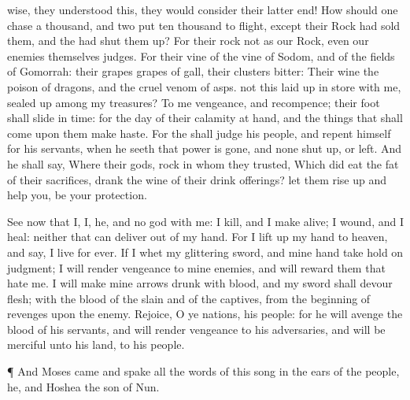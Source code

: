 {wise,
{} they
understood this,
{} they would
consider their latter
end!
How should
one
chase a
thousand, and
two put
ten
thousand to
flight,
except their
Rock had
sold
them, and the
{} had shut them
up?
For their
rock
{} not as our
Rock, even our
enemies themselves
{}
judges.
For their
vine
{} of the
vine of
Sodom, and of the
fields of
Gomorrah: their
grapes
{}
grapes of
gall, their
clusters
{}
bitter:
Their
wine
{} the
poison of
dragons, and the
cruel
venom of
asps.
 not this laid up in
store with me,
{} sealed
up among my
treasures?
To me
{}
vengeance, and
recompence; their
foot shall
slide in
{}
time: for the
day of their
calamity
{} at
hand, and the things that shall
come upon them make
haste.
For the
{} shall
judge his
people, and
repent himself for his
servants, when he
seeth that
{}
power is
gone, and
{}
none shut
up, or
left.
And he shall
say, Where
{} their
gods,
{}
rock in whom they
trusted,
Which did
eat the
fat of their
sacrifices,
{}
drank the
wine of their drink
offerings? let them rise
up and
help you,
{} be your
protection.
\par }{\PP {}See now that I,
{} I,
{} he, and
{} no
god with me: I
kill, and I make
alive; I
wound, and I
heal: neither
{} that can
deliver out of my
hand.
For I lift
up my
hand to
heaven, and
say, I
live for
ever.
If I
whet my
glittering
sword, and mine
hand take
hold on
judgment; I will
render
vengeance to mine
enemies, and will
reward them that
hate me.
I will make mine
arrows
drunk with
blood, and my
sword shall
devour
flesh;
{} with the
blood of the
slain and of the
captives, from the
beginning of
revenges upon the
enemy.
Rejoice, O ye
nations,
{} his
people: for he will
avenge the
blood of his
servants, and will
render
vengeance to his
adversaries, and will be
merciful unto his
land,
{} to his
people.
\par }{\PP {}¶ And
Moses
came and
spake all the
words of this
song in the
ears of the
people, he, and
Hoshea the
son of
Nun.}
